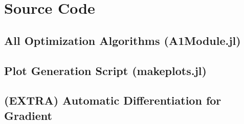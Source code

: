 \documentclass{article}
\begin{document}
    \section{Source Code}

    \subsection{All Optimization Algorithms (A1Module.jl)}

    \subsection{Plot Generation Script (makeplots.jl)}

    \subsection{(EXTRA) Automatic Differentiation for Gradient}

    
\end{document}
